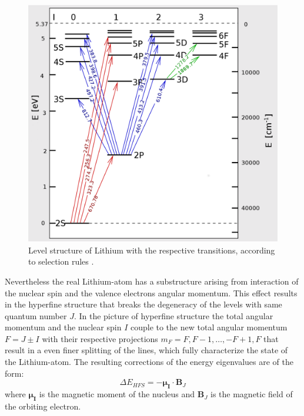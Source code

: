 \begin{figure}[h]
\begin{center}
\includegraphics[scale=.4] {levels2}
\end{center}
\caption{Level structure of Lithium with the respective transitions, according to selection rules \cite{transitions}.}
\label{levels2}
\end{figure}
Nevertheless the real Lithium-atom has a substructure arising from interaction of the nuclear spin and the valence electrons angular momentum. This effect results in the hyperfine structure that breaks the degeneracy of the levels with same quantum number $J$. In the picture of hyperfine structure the total angular momentum and the nuclear spin $I$ couple to the new total angular momentum $F=J\pm I$ with their respective projections $m_F=F,F-1,\dots,-F+1,F$ that result in a even finer splitting of the lines, which fully characterize the state of the Lithium-atom. The resulting corrections of the energy eigenvalues are of the form:
\begin{equation}
\Delta E_{HFS}=-\boldsymbol{\mu_I}\cdot \boldsymbol{B}_J
\end{equation}
where $\boldsymbol{\mu_I}$ is the magnetic moment of the nucleus and $\boldsymbol{B}_J$ is the magnetic field of the orbiting electron.
